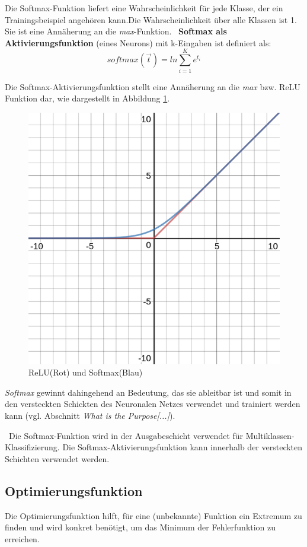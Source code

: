 Die Softmax-Funktion liefert eine Wahrscheinlichkeit für jede Klasse, der ein Trainingsbeispiel angehören kann.Die Wahrscheinlichkeit über alle Klassen ist 1. Sie ist eine Annäherung an die \textit{max}-Funktion.
~\newline \textbf{Softmax als Aktivierungsfunktion} (eines Neurons) mit k-Eingaben ist definiert als:
\begin{equation}
	\label{SoftmaxNeuron}
	softmax(\vec{t})=ln\sum_{i=1}^{K}e^{t_i}
\end{equation}

Die Softmax-Aktivierungsfunktion stellt eine Annäherung an die \textit{max} bzw. ReLU Funktion dar, wie dargestellt in Abbildung \ref{fig:Softmaxplot}.
\begin{figure}[h]
	\begin{center}
		\includegraphics[width=0.4\linewidth]{Bilder/Softmaxplot}
		\caption[Softmax: \url{
			https://www.quora.com/Why-is-softmax-activate-function-called-softmax}]{ReLU(Rot) und Softmax(Blau)}
		\label{fig:Softmaxplot}
	\end{center}
\end{figure}  \textit{Softmax} gewinnt dahingehend an Bedeutung, das sie ableitbar ist und somit in den versteckten Schickten des Neuronalen Netzes verwendet und trainiert werden kann (vgl. \cite{Softmax} Abschnitt \textit{What is the Purpose[...]}).

~\newline Die Softmax-Funktion wird in der Ausgabeschicht verwendet für Multiklassen-Klassifizierung. Die Softmax-Aktivierungsfunktion kann innerhalb der versteckten Schichten verwendet werden. 
\subsection{Optimierungsfunktion}
Die Optimierungsfunktion hilft, für eine (unbekannte) Funktion ein Extremum zu finden und wird konkret benötigt, um das Minimum der Fehlerfunktion zu erreichen.  

